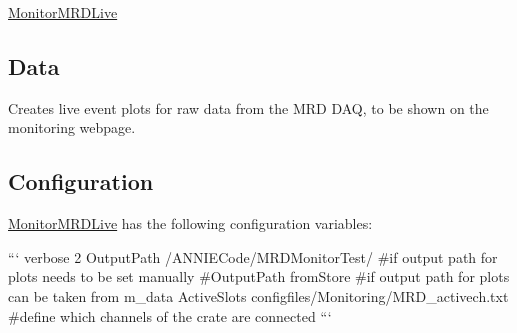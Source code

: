 \hyperlink{classMonitorMRDLive}{Monitor\-M\-R\-D\-Live}

\subsection*{Data}

Creates live event plots for raw data from the M\-R\-D D\-A\-Q, to be shown on the monitoring webpage.

\subsection*{Configuration}

\hyperlink{classMonitorMRDLive}{Monitor\-M\-R\-D\-Live} has the following configuration variables\-:

``` verbose 2 Output\-Path /\-A\-N\-N\-I\-E\-Code/\-M\-R\-D\-Monitor\-Test/ \#if output path for plots needs to be set manually \#\-Output\-Path from\-Store \#if output path for plots can be taken from m\-\_\-data Active\-Slots configfiles/\-Monitoring/\-M\-R\-D\-\_\-activech.\-txt \#define which channels of the crate are connected ``` 